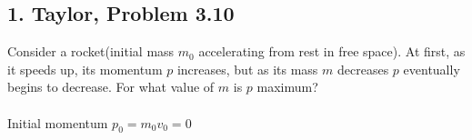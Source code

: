 \documentclass[a4paper,12pt]{article}
\begin{document}
\subsection*{1. Taylor, Problem 3.10}
Consider a rocket(initial mass $m_0$ accelerating from rest in free space).  At first, as it speeds up, its momentum $p$ increases, but as its mass $m$ decreases $p$ eventually begins to decrease.  For what value of $m$ is $p$ maximum?\\
\\
Initial momentum $p_0 = m_0v_0 = 0$\\
\end{document}
